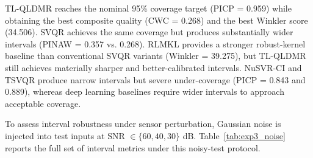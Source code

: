 \documentclass[a4paper]{cas-sc}
\begin{document}
TL-QLDMR reaches the nominal 95\% coverage target (PICP = 0.959) while obtaining the best composite quality (CWC = 0.268) and the best Winkler score (34.506). SVQR achieves the same coverage but produces substantially wider intervals (PINAW = 0.357 vs. 0.268). RLMKL provides a stronger robust-kernel baseline than conventional SVQR variants (Winkler = 39.275), but TL-QLDMR still achieves materially sharper and better-calibrated intervals. NuSVR-CI and TSVQR produce narrow intervals but severe under-coverage (PICP = 0.843 and 0.889), whereas deep learning baselines require wider intervals to approach acceptable coverage.

To assess interval robustness under sensor perturbation, Gaussian noise is injected into test inputs at SNR $\in \{60,40,30\}$ dB.
Table~\ref{tab:exp3_noise} reports the full set of interval metrics under this noisy-test protocol.

\FloatBarrier
\end{document}

